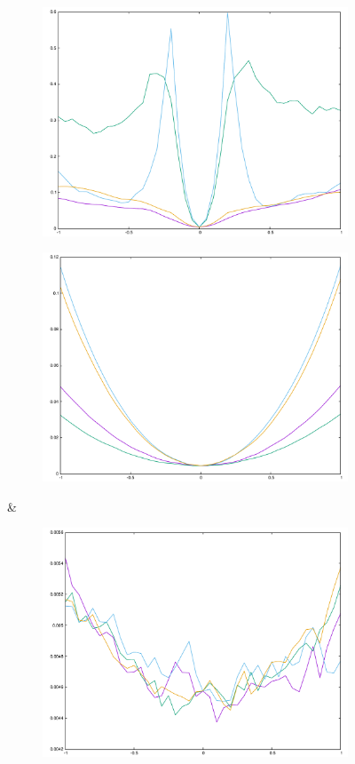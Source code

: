 {\begin{figure}[H]
\begin{subfigure}{.33\textwidth}
	\includegraphics[width=\linewidth]{fig/ajherr/t3t/L_chi.pdf}
\end{subfigure}%
\begin{subfigure}{.33\textwidth}
	\includegraphics[width=\linewidth]{fig/ajherr/t3t/M_chi.pdf}
\end{subfigure}&
\begin{subfigure}{.33\textwidth}
	\includegraphics[width=\linewidth]{fig/ajherr/t3t/S_chi.pdf}

\end{subfigure}
\end{figure}}
